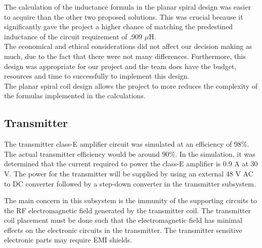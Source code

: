 \documentclass[12pt]{article}
\begin{document}
\indent
The calculation of the inductance formula in the planar spiral design was easier to acquire than the other two proposed solutions. This was crucial because it significantly gave the project a higher chance of matching the predestined inductance of the circuit requirement of .909 $\mu$H.\\

\indent
The economical and ethical considerations did not affect our decision making as much, due to the fact that there were not many differences. Furthermore, this design was appropriate for our project and the team does have the budget, resources and time to successfully to implement this design. \\

\indent
The planar spiral coil design allows the project to more reduces the complexity of the formulas implemented in the calculations. 


\subsection{Transmitter}

\indent \indent
The transmitter class-E amplifier circuit was simulated at an efficiency of 98\%. The actual transmitter efficiency would be around 90\%. In the simulation, it was determined that the current required to power the class-E amplifier is 0.9 A at 30 V. The power for the transmitter will be supplied by using an external 48 V AC to DC converter followed by a step-down converter in the transmitter subsystem.\\

\pagebreak

\indent
The main concern in this subsystem is the immunity of the supporting circuits to the RF electromagnetic field generated by the transmitter coil. The transmitter coil placement must be done such that the electromagnetic field has minimal effects on the electronic circuits in the transmitter. The transmitter sensitive electronic parts may require EMI shields.\\
\end{document}
